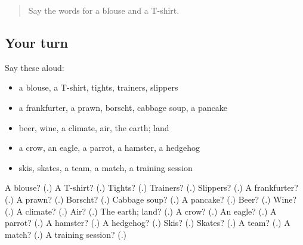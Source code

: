 \label{lesson:RU-R166-second-pass-words-from-chapters-162-166}



\begin{quote}
Say the words for a blouse and a T-shirt.
\end{quote}

\subsection*{Your turn}
Say these aloud:

\begin{itemize}
\raggedright
  \item a blouse, a T-shirt, tights, trainers, slippers
  \item a frankfurter, a prawn, borscht, cabbage soup, a pancake
  \item beer, wine, a climate, air, the earth; land
  \item a crow, an eagle, a parrot, a hamster, a hedgehog
  \item skis, skates, a team, a match, a training session
\end{itemize}

\begin{tcolorbox}[breakable,colback=teal!4,colframe=teal!35!black,title={Before you move on}]
A blouse? (\textbf{}.) A T-shirt? (\textbf{}.) Tights? (\textbf{}.) Trainers? (\textbf{}.) Slippers? (\textbf{}.) A frankfurter? (\textbf{}.) A prawn? (\textbf{}.) Borscht? (\textbf{}.) Cabbage soup? (\textbf{}.) A pancake? (\textbf{}.) Beer? (\textbf{}.) Wine? (\textbf{}.) A climate? (\textbf{}.) Air? (\textbf{}.) The earth; land? (\textbf{}.) A crow? (\textbf{}.) An eagle? (\textbf{}.) A parrot? (\textbf{}.) A hamster? (\textbf{}.) A hedgehog? (\textbf{}.) Skis? (\textbf{}.) Skates? (\textbf{}.) A team? (\textbf{}.) A match? (\textbf{}.) A training session? (\textbf{}.)
\end{tcolorbox}
